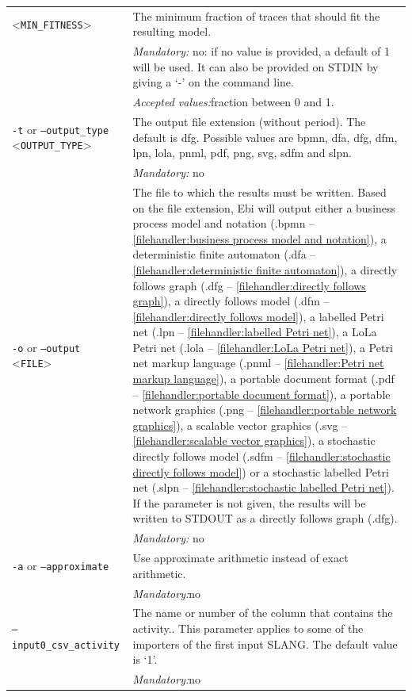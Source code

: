 {\begin{tabularx}{\linewidth}{lX}
<\texttt{MIN\_FITNESS}>&The minimum fraction of traces that should fit the resulting model.\\
&\textit{Mandatory:} \quad no: if no value is provided, a default of 1 will be used. It can also be provided on STDIN by giving a `-' on the command line.\\
&\textit{Accepted values:}\quad fraction between 0 and 1.\\
\texttt{-t} or \texttt{--output\_type} <\texttt{OUTPUT\_TYPE}> &
The output file extension (without period). The default is dfg. Possible values are bpmn, dfa, dfg, dfm, lpn, lola, pnml, pdf, png, svg, sdfm and slpn.\\
&\textit{Mandatory:} \quad no\\
\texttt{-o} or \texttt{--output} <\texttt{FILE}> &
The file to which the results must be written. Based on the file extension, Ebi will output either a business process model and notation (.bpmn -- \cref{filehandler:business process model and notation}), a deterministic finite automaton (.dfa -- \cref{filehandler:deterministic finite automaton}), a directly follows graph (.dfg -- \cref{filehandler:directly follows graph}), a directly follows model (.dfm -- \cref{filehandler:directly follows model}), a labelled Petri net (.lpn -- \cref{filehandler:labelled Petri net}), a LoLa Petri net (.lola -- \cref{filehandler:LoLa Petri net}), a Petri net markup language (.pnml -- \cref{filehandler:Petri net markup language}), a portable document format (.pdf -- \cref{filehandler:portable document format}), a portable network graphics (.png -- \cref{filehandler:portable network graphics}), a scalable vector graphics (.svg -- \cref{filehandler:scalable vector graphics}), a stochastic directly follows model (.sdfm -- \cref{filehandler:stochastic directly follows model}) or a stochastic labelled Petri net (.slpn -- \cref{filehandler:stochastic labelled Petri net}).
If the parameter is not given, the results will be written to STDOUT as a directly follows graph (.dfg).\\
&\textit{Mandatory:} \quad no\\
\texttt{-a} or \texttt{--approximate} & Use approximate arithmetic instead of exact arithmetic.\\
&\textit{Mandatory:}\quad no\\
\texttt{--input0\_csv\_activity} & The name or number of the column that contains the activity.. This parameter applies to some of the importers of the first input SLANG. The default value is `1'.\\
&\textit{Mandatory:}\quad no\\

\end{tabularx}}
